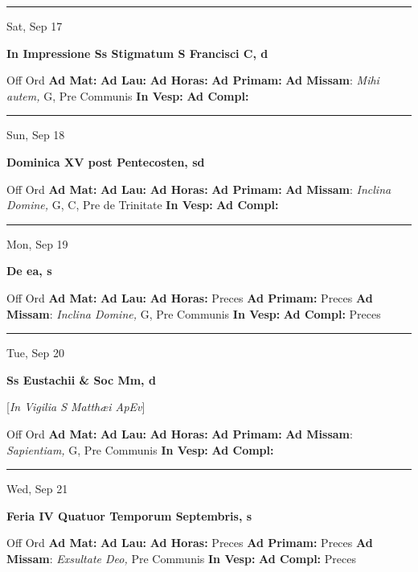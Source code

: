 \documentclass[letterpaper, 10pt]{article}
\begin{document}
\hrule
\begin{center}
Sat, Sep 17
\end{center}\textbf{ \large In Impressione Ss Stigmatum S Francisci C, \textnormal{\normalsize d}}
\begin{justify}
Off Ord
\textbf{Ad Mat: }
\textbf{Ad Lau: }
\textbf{Ad Horas: }
\textbf{Ad Primam: }
\textbf{Ad Missam}: \textit{Mihi autem,} G, Pre Communis
\textbf{In Vesp: }
\textbf{Ad Compl: }\end{justify}



\hrule
\begin{center}
Sun, Sep 18
\end{center}\textbf{ \large Dominica XV post Pentecosten, \textnormal{\normalsize sd}}
\begin{justify}
Off Ord
\textbf{Ad Mat: }
\textbf{Ad Lau: }
\textbf{Ad Horas: }
\textbf{Ad Primam: }
\textbf{Ad Missam}: \textit{Inclina Domine,} G, C, Pre de Trinitate
\textbf{In Vesp: }
\textbf{Ad Compl: }\end{justify}



\hrule
\begin{center}
Mon, Sep 19
\end{center}\textbf{ \large De ea, \textnormal{\normalsize s}}
\begin{justify}
Off Ord
\textbf{Ad Mat: }
\textbf{Ad Lau: }
\textbf{Ad Horas: }Preces
\textbf{Ad Primam: }Preces
\textbf{Ad Missam}: \textit{Inclina Domine,} G, Pre Communis
\textbf{In Vesp: }
\textbf{Ad Compl: }Preces\end{justify}



\hrule
\begin{center}
Tue, Sep 20
\end{center}\textbf{ \large Ss Eustachii \& Soc Mm, \textnormal{\normalsize d}}

[\textit{In Vigilia S Matthæi ApEv}]
\begin{justify}
Off Ord
\textbf{Ad Mat: }
\textbf{Ad Lau: }
\textbf{Ad Horas: }
\textbf{Ad Primam: }
\textbf{Ad Missam}: \textit{Sapientiam,} G, Pre Communis
\textbf{In Vesp: }
\textbf{Ad Compl: }\end{justify}



\hrule
\begin{center}
Wed, Sep 21
\end{center}\textbf{ \large Feria IV Quatuor Temporum Septembris, \textnormal{\normalsize s}}
\begin{justify}
Off Ord
\textbf{Ad Mat: }
\textbf{Ad Lau: }
\textbf{Ad Horas: }Preces
\textbf{Ad Primam: }Preces
\textbf{Ad Missam}: \textit{Exsultate Deo,} Pre Communis
\textbf{In Vesp: }
\textbf{Ad Compl: }Preces\end{justify}
\end{document}
